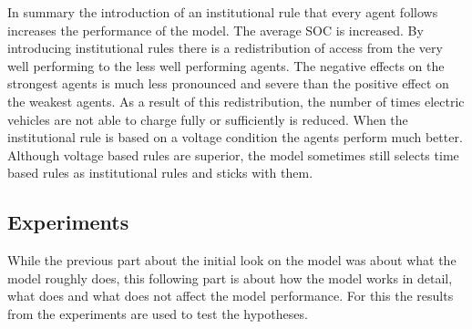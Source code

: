 \documentclass[a4paper]{article}
\begin{document}
In summary the introduction of an institutional rule that every agent follows increases the performance of the model. 
The average SOC is increased. By introducing institutional rules there is a redistribution of access from the very well 
performing to the less well performing agents. The negative effects on the strongest agents is much less pronounced and severe than the 
positive effect on the weakest agents. 
As a result of this redistribution, the number of times 
electric vehicles are not able to charge fully or sufficiently is reduced. When the institutional rule is based on a voltage condition
the agents perform much better. Although voltage based rules are superior, the model sometimes still 
selects time based rules as institutional rules and sticks with them. 


\clearpage
\subsection{Experiments}
While the previous part about the initial look on the model was about what the model roughly does, this following part is about 
how the model works in detail, what does and what does not affect the model performance. For this the results from the 
experiments are used to test the hypotheses. 
\end{document}
